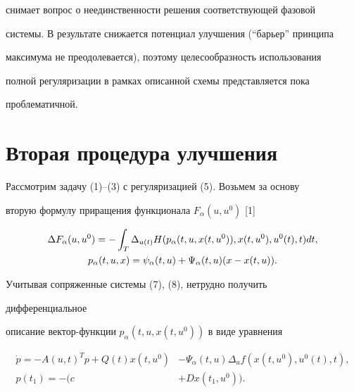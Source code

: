 снимает вопрос о неединственности решения соответствующей фазовой 


системы. В результате снижается потенциал улучшения (``барьер'' принципа 


максимума не преодолевается), поэтому целесообразность использования 


полной регуляризации в рамках описанной схемы представляется пока 


проблематичной. 


 


\section{Вторая процедура улучшения} 


 


Рассмотрим задачу (1)--(3) с регуляризацией (5). Возьмем за основу 


вторую формулу приращения функционала $F_\alpha(u,u^0)$ [1] 


\begin{gather} 


\Delta F_\alpha(u,u^0)=-\int_T\Delta_{u(t)} 


H(p_\alpha(t,u,x(t,u^0)),x(t,u^0),u^0(t),t)dt,\\ 


p_\alpha(t,u,x)=\psi_\alpha(t,u)+\Psi_\alpha(t,u) 


(x-x(t,u)).\notag 


\end{gather} 


Учитывая сопряженные системы (7), (8), нетрудно получить 


дифференциальное 


описание вектор-функции $p_\alpha(t,u,x(t,u^0))$ в виде уравнения 


\begin{equation} 


\begin{split} 


\Dot p=-A(u,t)^T p+Q(t)x(t,u^0)&-\Psi_\alpha(t,u) 


\Delta_u f(x(t,u^0),u^0(t),t),\\ 


p(t_1)=-(c&+D x(t_1,u^0)). 


\end{split} 


\end{equation} 


